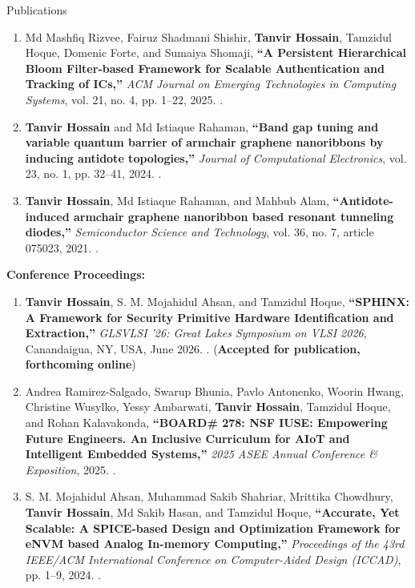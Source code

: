 \begin{rSection}{Publications}
\begin{enumerate}
    \item Md Mashfiq Rizvee, Fairuz Shadmani Shishir, \textbf{Tanvir Hossain}, Tamzidul Hoque, Domenic Forte, and Sumaiya Shomaji, \textbf{``A Persistent Hierarchical Bloom Filter-based Framework for Scalable Authentication and Tracking of ICs,''} \emph{ACM Journal on Emerging Technologies in Computing Systems}, vol. 21, no. 4, pp. 1--22, 2025. .

    \item \textbf{Tanvir Hossain} and Md Istiaque Rahaman, \textbf{``Band gap tuning and variable quantum barrier of armchair graphene nanoribbons by inducing antidote topologies,''} \emph{Journal of Computational Electronics}, vol. 23, no. 1, pp. 32--41, 2024. .

    \item \textbf{Tanvir Hossain}, Md Istiaque Rahaman, and Mahbub Alam, \textbf{``Antidote-induced armchair graphene nanoribbon based resonant tunneling diodes,''} \emph{Semiconductor Science and Technology}, vol. 36, no. 7, article 075023, 2021. .
\end{enumerate}

\vspace{-0.15cm}
\textbf{Conference Proceedings:}
\vspace{-0.15cm}

\begin{enumerate}[label=\arabic*.]
    \item \textbf{Tanvir Hossain}, S. M. Mojahidul Ahsan, and Tamzidul Hoque, \textbf{``SPHINX: A Framework for Security Primitive Hardware Identification and Extraction,''} \emph{GLSVLSI '26: Great Lakes Symposium on VLSI 2026}, Canandaigua, NY, USA, June 2026. . (\textbf{Accepted for publication, forthcoming online})

    \item Andrea Ramirez-Salgado, Swarup Bhunia, Pavlo Antonenko, Woorin Hwang, Christine Wusylko, Yessy Ambarwati, \textbf{Tanvir Hossain}, Tamzidul Hoque, and Rohan Kalavakonda, \textbf{``BOARD\# 278: NSF IUSE: Empowering Future Engineers. An Inclusive Curriculum for AIoT and Intelligent Embedded Systems,''} \emph{2025 ASEE Annual Conference \& Exposition}, 2025. .

    \item S. M. Mojahidul Ahsan, Muhammad Sakib Shahriar, Mrittika Chowdhury, \textbf{Tanvir Hossain}, Md Sakib Hasan, and Tamzidul Hoque, \textbf{``Accurate, Yet Scalable: A SPICE-based Design and Optimization Framework for eNVM based Analog In-memory Computing,''} \emph{Proceedings of the 43rd IEEE/ACM International Conference on Computer-Aided Design (ICCAD)}, pp. 1--9, 2024. .


\end{enumerate}
\end{rSection}
